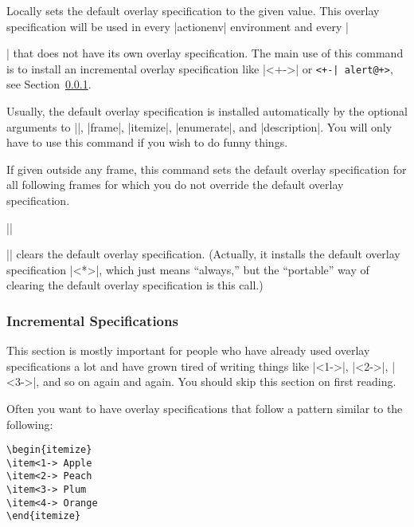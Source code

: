 \begin{command}{\beamerdefaultoverlayspecification{}}
  Locally sets the default overlay specification to the given value. This overlay specification will be used in every |actionenv| environment and every |\item| that does not have its own overlay specification. The main use of this command is to install an incremental overlay specification like |<+->| or \verb/<+-| alert@+>/, see Section~\ref{section-incremental}.

  Usually, the default overlay specification is installed automatically by the optional arguments to |\frame|, |frame|, |itemize|, |enumerate|, and |description|. You will only have to use this command if you wish to do funny things.

  If given outside any frame, this command sets the default overlay specification for all following frames for which you do not override the default overlay specification.

  \example
  |\beamerdefaultoverlayspecification{<+->}|

  \example
  |\beamerdefaultoverlayspecification{}| clears the default overlay specification. (Actually, it installs the default overlay specification |<*>|, which just means ``always,'' but the ``portable'' way of clearing the default overlay specification is this call.)
\end{command}

\subsubsection{Incremental Specifications}
\label{section-incremental}

This section is mostly important for people who have already used overlay specifications a lot and have grown tired of writing things like |<1->|, |<2->|, |<3->|, and so on again and again. You should skip this section on first reading.

Often you want to have overlay specifications that follow a pattern similar to the following:
\begin{verbatim}
\begin{itemize}
\item<1-> Apple
\item<2-> Peach
\item<3-> Plum
\item<4-> Orange
\end{itemize}
\end{verbatim}

